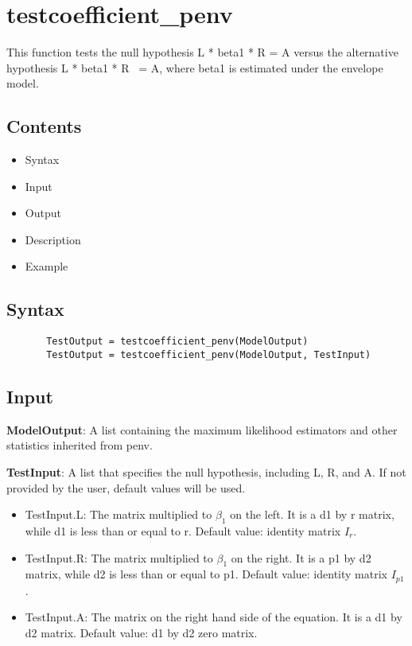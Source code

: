 \documentclass[a4paper,11pt,openany]{memoir}
\begin{document}
\newpage

\rmfamily
\color{black}\section{testcoefficient\_penv}


This function tests the null hypothesis L * beta1 * R = A versus the
alternative hypothesis L * beta1 * R ~= A, where beta1 is estimated under
the envelope model.
    
\subsection*{Contents}

\begin{itemize}
\setlength{\itemsep}{-1ex}
   \item Syntax
   \item Input
   \item Output
   \item Description
   \item Example
\end{itemize}


\subsection*{Syntax}


\begin{verbatim}       TestOutput = testcoefficient_penv(ModelOutput)
       TestOutput = testcoefficient_penv(ModelOutput, TestInput)\end{verbatim}
    

\subsection*{Input}

\begin{par}
\textbf{ModelOutput}: A list containing the maximum likelihood estimators and other statistics inherited from penv.
\end{par} \vspace{1em}
\begin{par}
\textbf{TestInput}: A list that specifies the null hypothesis, including L, R, and A.  If not provided by the user, default values will be used.
\end{par} \vspace{1em}
\begin{itemize}
\setlength{\itemsep}{-1ex}
   \item TestInput.L: The matrix multiplied to $\beta_1$ on the left.  It is a d1 by r matrix, while d1 is less than or equal to r.  Default value: identity matrix $I_r$.
   \item TestInput.R: The matrix multiplied to $\beta_1$ on the right.  It is a p1 by d2 matrix, while d2 is less than or equal to p1.  Default value: identity matrix $I_{p1}$.
   \item TestInput.A: The matrix on the right hand side of the equation.  It is a d1 by d2 matrix.  Default value: d1 by d2 zero matrix.
\end{itemize}
\end{document}
